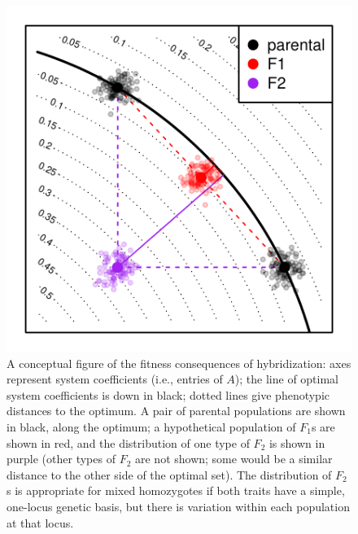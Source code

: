 \documentclass{article}
\newcommand{\1}{\mathbbm{1}}
\begin{document}
\begin{figure}[H]
\centering
\includegraphics{figures/conceptual_fig}
\caption{
    \label{fig:conceptual_fig}
    A conceptual figure of the fitness consequences of hybridization:
    axes represent system coefficients (i.e., entries of $A$);
    the line of optimal system coefficients is down in black;
    dotted lines give phenotypic distances to the optimum.
    A pair of parental populations are shown in black, along the optimum;
    a hypothetical population of $F_1$s are shown in red,
    and the distribution of one type of $F_2$ is shown in purple
    (other types of $F_2$ are not shown; 
    some would be a similar distance to the other side of the optimal set).
    The distribution of $F_2$s is appropriate for mixed homozygotes
    if both traits have a simple, one-locus genetic basis,
    but there is variation within each population at that locus.
}
\end{figure}
\end{document}

